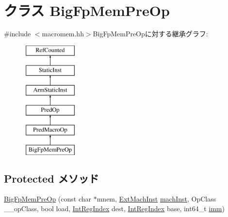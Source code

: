 \hypertarget{classArmISA_1_1BigFpMemPreOp}{
\section{クラス BigFpMemPreOp}
\label{classArmISA_1_1BigFpMemPreOp}
}


{\ttfamily \#include $<$macromem.hh$>$}BigFpMemPreOpに対する継承グラフ:\begin{figure}[H]
\begin{center}
\leavevmode
\includegraphics[height=6cm]{classArmISA_1_1BigFpMemPreOp}
\end{center}
\end{figure}
\subsection*{Protected メソッド}
\begin{DoxyCompactItemize}
\item 
\hyperlink{classArmISA_1_1BigFpMemPreOp_af22fb1c31af1287c19c29bb9e5b5628d}{BigFpMemPreOp} (const char $\ast$mnem, \hyperlink{classStaticInst_a5605d4fc727eae9e595325c90c0ec108}{ExtMachInst} \hyperlink{classStaticInst_a744598b194ca3d4201d9414ce4cc4af4}{machInst}, OpClass \_\-\_\-opClass, bool load, \hyperlink{namespaceArmISA_ae64680ba9fb526106829d6bf92fc791b}{IntRegIndex} dest, \hyperlink{namespaceArmISA_ae64680ba9fb526106829d6bf92fc791b}{IntRegIndex} base, int64\_\-t \hyperlink{namespaceArmISA_a2308526fcc9af84548a72f9ba3102ec1}{imm})
\end{DoxyCompactItemize}


